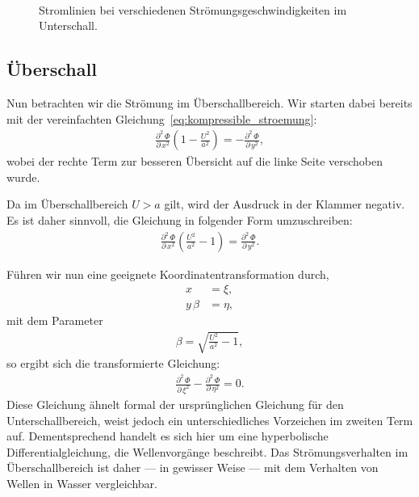 \begin{figure}
\begin{minipage}[b]{0.32\textwidth}
        \caption*{$\beta = 0$ ; $U = a$}
    \end{minipage}
    \caption{Stromlinien bei verschiedenen Strömungsgeschwindigkeiten im Unterschall.}
~\label{fig:abklingen_stromlinie}
\end{figure}

\subsection{Überschall}
Nun betrachten wir die Strömung im Überschallbereich.
Wir starten dabei bereits mit der vereinfachten 
Gleichung~\eqref{eq:kompressible_stroemung}:
\begin{align*}
    \frac{\partial^2\,\Phi}{\partial\,x^2}
    \left(1 - \frac{U^2}{a^2}\right)
    =
    -\frac{\partial^2\,\Phi}{\partial\,y^2},
\end{align*}
wobei der rechte Term zur besseren Übersicht auf die 
linke Seite verschoben wurde.

Da im Überschallbereich $U > a$ gilt, wird der Ausdruck 
in der Klammer negativ.
Es ist daher sinnvoll, die Gleichung in folgender 
Form umzuschreiben:
\begin{align*}
    \frac{\partial^2\,\Phi}{\partial\,x^2}
    \left(\frac{U^2}{a^2} - 1\right)
    =
    \frac{\partial^2\,\Phi}{\partial\,y^2}.
\end{align*}

Führen wir nun eine geeignete Koordinatentransformation durch,
\begin{align*}
    x 
    &= 
    \xi, \\
    y\,\beta 
    &= 
    \eta,
\end{align*}
mit dem Parameter
\begin{align*}
    \beta = \sqrt{\frac{U^2}{a^2} - 1},
\end{align*}
so ergibt sich die transformierte Gleichung:
\begin{align*}
    \frac{\partial^2\,\Phi}{\partial\,\xi^2}
    -
    \frac{\partial^2\,\Phi}{\partial\,\eta^2}
    =
    0.
\end{align*}
Diese Gleichung ähnelt formal der ursprünglichen Gleichung 
für den Unterschallbereich, weist jedoch ein 
unterschiedliches Vorzeichen im zweiten Term auf.
Dementsprechend handelt es sich hier um eine hyperbolische 
Differentialgleichung, die Wellenvorgänge beschreibt.
Das Strömungsverhalten im Überschallbereich ist daher — 
in gewisser Weise — mit dem Verhalten von Wellen in Wasser vergleichbar.
